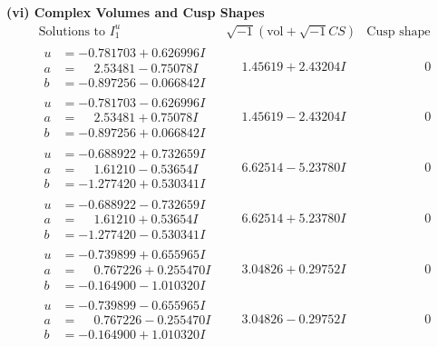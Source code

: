 \documentclass[1p]{elsarticle_modified}
\theoremstyle{definition}
\newcommand{\I}{\sqrt{-1}}
\begin{document}
\newpage\flushleft \textbf{(vi) Complex Volumes and Cusp Shapes}
$$\begin{array}{c|c|c}  
\text{Solutions to }I^u_{1}& \I (\text{vol} + \sqrt{-1}CS) & \text{Cusp shape}\\
 \hline 
\begin{aligned}
u &= -0.781703 + 0.626996 I \\
a &= \phantom{-}2.53481 - 0.75078 I \\
b &= -0.897256 - 0.066842 I\end{aligned}
 & \phantom{-}1.45619 + 2.43204 I & \phantom{-0.000000 } 0 \\ \hline\begin{aligned}
u &= -0.781703 - 0.626996 I \\
a &= \phantom{-}2.53481 + 0.75078 I \\
b &= -0.897256 + 0.066842 I\end{aligned}
 & \phantom{-}1.45619 - 2.43204 I & \phantom{-0.000000 } 0 \\ \hline\begin{aligned}
u &= -0.688922 + 0.732659 I \\
a &= \phantom{-}1.61210 - 0.53654 I \\
b &= -1.277420 + 0.530341 I\end{aligned}
 & \phantom{-}6.62514 - 5.23780 I & \phantom{-0.000000 } 0 \\ \hline\begin{aligned}
u &= -0.688922 - 0.732659 I \\
a &= \phantom{-}1.61210 + 0.53654 I \\
b &= -1.277420 - 0.530341 I\end{aligned}
 & \phantom{-}6.62514 + 5.23780 I & \phantom{-0.000000 } 0 \\ \hline\begin{aligned}
u &= -0.739899 + 0.655965 I \\
a &= \phantom{-}0.767226 + 0.255470 I \\
b &= -0.164900 - 1.010320 I\end{aligned}
 & \phantom{-}3.04826 + 0.29752 I & \phantom{-0.000000 } 0 \\ \hline\begin{aligned}
u &= -0.739899 - 0.655965 I \\
a &= \phantom{-}0.767226 - 0.255470 I \\
b &= -0.164900 + 1.010320 I\end{aligned}
 & \phantom{-}3.04826 - 0.29752 I & \phantom{-0.000000 } 0 \\ \hline\begin{aligned}

\end{aligned}
\end{array}$$
\end{document}
